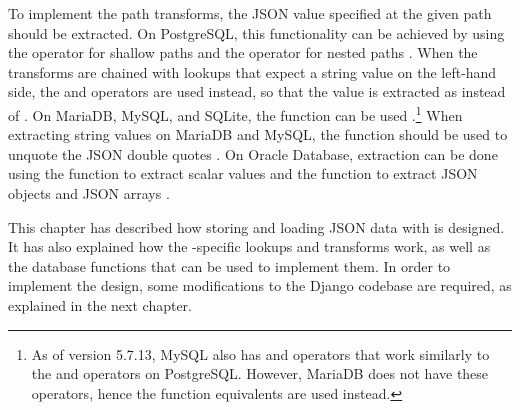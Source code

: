 To implement the path transforms, the JSON value specified at the given path
should be extracted. On PostgreSQL, this functionality can be achieved by using
the \code{->} operator for shallow paths and the \code{\#>} operator for nested
paths \cite{postgres:json_operators}. When the transforms are chained with
lookups that expect a string value on the left-hand side, the \code{->>} and
\code{\#>>} operators are used instead, so that the value is extracted as
 instead of . On MariaDB, MySQL, and SQLite, the
 function can be used \cite{mariadb:json_extract,
mysql:json_search, sqlite:json1}.\footnote{As of version 5.7.13, MySQL also has
\code{->} and \code{->>} operators that work similarly to the \code{\#>} and
\code{\#>>} operators on PostgreSQL. However, MariaDB does not have these
operators, hence the function equivalents are used instead.} When extracting
string values on MariaDB and MySQL, the  function should be
used to unquote the JSON double quotes \cite{mariadb:json_unquote,
mysql:json_modify}. On Oracle Database, extraction can be done using the
 function to extract scalar values and the 
function to extract JSON objects and JSON arrays \cite{oracle:json_value,
oracle:json_query}.

This chapter has described how storing and loading JSON data with
 is designed. It has also explained how the
-specific lookups and transforms work, as well as the database
functions that can be used to implement them. In order to implement the design,
some modifications to the Django codebase are required, as explained in the
next chapter.
